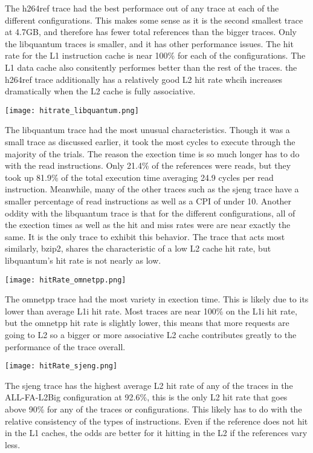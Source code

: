 \documentclass[cacheSimReport.tex]{subfiles}
\begin{document}
The h264ref trace had the best performace out of any trace at each of the different configurations. This makes some sense as it is the second smallest trace at 4.7GB, and therefore has fewer total references than the bigger traces. Only the libquantum traces is smaller, and it has other performance issues. The hit rate for the L1 instruction cache is near 100\% for each of the configurations. The L1 data cache also consitently performes better than the rest of the traces. the h264ref trace additionally has a relatively good L2 hit rate whcih increases dramatically when the L2 cache is fully associative.

\hspace{-.9cm}\texttt{[image: hitrate\_libquantum.png]}

The libquantum trace had the most unusual characteristics. Though it was a small trace as discussed earlier, it took the most cycles to execute through the majority of the trials. The reason the exection time is so much longer has to do with the read instructions. Only 21.4\% of the references were reads, but they took up 81.9\% of the total execution time averaging 24.9 cycles per read instruction. Meanwhile, many of the other traces such as the sjeng trace have a smaller percentage of read instructions as well as a CPI of under 10. Another oddity with the libquantum trace is that for the different configurations, all of the exection times as well as the hit and miss rates were are near exactly the same. It is the only trace to exhibit this behavior. The trace that acts most similarly, bzip2, shares the characteristic of a low L2 cache hit rate, but libquantum's hit rate is not nearly as low. 

\hspace{-.9cm}\texttt{[image: hitRate\_omnetpp.png]}

The omnetpp trace had the most variety in exection time. This is likely due to its lower than average L1i hit rate. Most traces are near 100\% on the L1i hit rate, but the omnetpp hit rate is slightly lower, this means that more requests are going to L2 so a bigger or more associative L2 cache contributes greatly to the performance of the trace overall.

\hspace{-.9cm}\texttt{[image: hitRate\_sjeng.png]}
 
The sjeng trace has the highest average L2 hit rate of any of the traces in the ALL-FA-L2Big configuration at 92.6\%, this is the only L2 hit rate that goes above 90\% for any of the traces or configurations. This likely has to do with the relative consistency of the types of instructions. Even if the reference does not hit in the L1 caches, the odds are better for it hitting in the L2 if the references vary less.
\end{document}
